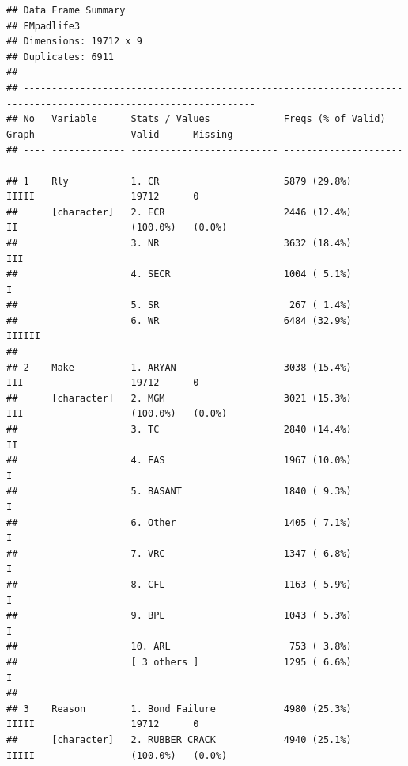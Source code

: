 \documentclass[nofonts,]{tufte-book}
\begin{document}
\begin{verbatim}
## Data Frame Summary  
## EMpadlife3  
## Dimensions: 19712 x 9  
## Duplicates: 6911  
## 
## ---------------------------------------------------------------------------------------------------------------
## No   Variable      Stats / Values             Freqs (% of Valid)     Graph                 Valid      Missing  
## ---- ------------- -------------------------- ---------------------- --------------------- ---------- ---------
## 1    Rly           1. CR                      5879 (29.8%)           IIIII                 19712      0        
##      [character]   2. ECR                     2446 (12.4%)           II                    (100.0%)   (0.0%)   
##                    3. NR                      3632 (18.4%)           III                                       
##                    4. SECR                    1004 ( 5.1%)           I                                         
##                    5. SR                       267 ( 1.4%)                                                     
##                    6. WR                      6484 (32.9%)           IIIIII                                    
## 
## 2    Make          1. ARYAN                   3038 (15.4%)           III                   19712      0        
##      [character]   2. MGM                     3021 (15.3%)           III                   (100.0%)   (0.0%)   
##                    3. TC                      2840 (14.4%)           II                                        
##                    4. FAS                     1967 (10.0%)           I                                         
##                    5. BASANT                  1840 ( 9.3%)           I                                         
##                    6. Other                   1405 ( 7.1%)           I                                         
##                    7. VRC                     1347 ( 6.8%)           I                                         
##                    8. CFL                     1163 ( 5.9%)           I                                         
##                    9. BPL                     1043 ( 5.3%)           I                                         
##                    10. ARL                     753 ( 3.8%)                                                     
##                    [ 3 others ]               1295 ( 6.6%)           I                                         
## 
## 3    Reason        1. Bond Failure            4980 (25.3%)           IIIII                 19712      0        
##      [character]   2. RUBBER CRACK            4940 (25.1%)           IIIII                 (100.0%)   (0.0%)   

\end{verbatim}
\end{document}
